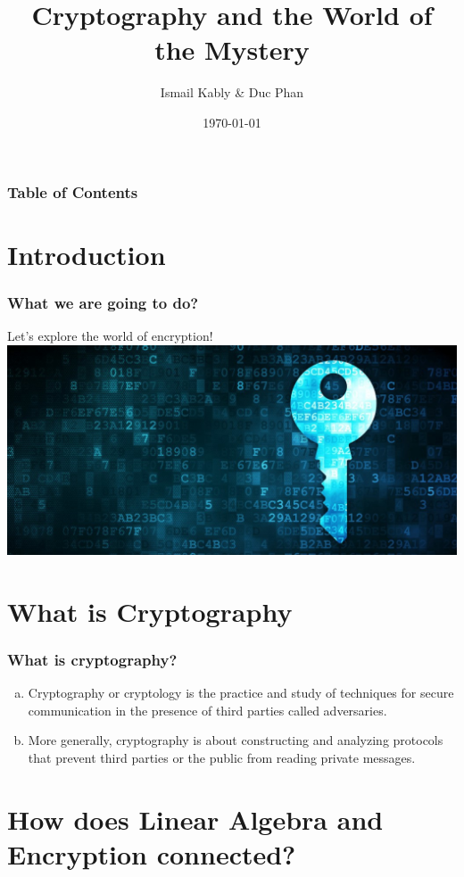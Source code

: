\documentclass[11pt]{beamer}
\title{	Cryptography and the World of the Mystery }
\author{Ismail Kably \& Duc Phan}
\date{\today}
\begin{document}
\begin{frame}
	
	\titlepage
	
\end{frame}

\begin{frame}\frametitle{Table of Contents}
	
	\tableofcontents
	
\end{frame}

\section{Introduction}

\begin{frame}\frametitle{What we are going to do?}
	
\center Let's explore the world of encryption!
\center \includegraphics[scale=0.2]{encryption}
\end{frame}

\section{What is Cryptography}
\begin{frame}\frametitle{What is cryptography?}
	\begin{enumerate}[a.]
	\item Cryptography or cryptology is the practice and study of techniques for secure communication in the presence of third parties called adversaries.
	\item More generally, cryptography is about constructing and analyzing protocols that prevent third parties or the public from reading private messages.
	\end{enumerate}
\end{frame}

\section{How does Linear Algebra and Encryption connected?}
\end{document}
